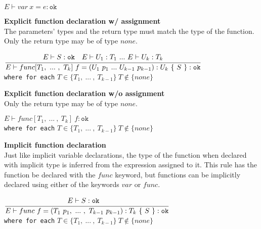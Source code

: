 \begin{center}
	\begin{math}
	E \vdash var\ x = e : \texttt{ok}
	\end{math}
\end{center}

\textbf{Explicit function declaration w/ assignment}\\
The parameters' types and the return type must match the type of the function.
Only the return type may be of type $none$.

\begin{center}
	\begin{math}
		\cfrac
		{E\vdash S : \texttt{ok}\quad E \vdash U_1 : T_1\
			.
			.
			.
			\ E \vdash U_k : T_k}
		{E \vdash func[T_1,\
			.
			.
			.
			\ ,\ T_k]\ f = (U_1\ p_1\
			.
			.
			.
			\ U_{k-1}\ p_{k-1}): U_k\ \{\ S\ \} : \texttt{ok}}
	\end{math}
	\\[1\baselineskip]
	\texttt{where for each} $T \in \{T_1,\ .
	.
	.
	\ ,\ T_{k-1}\}\ T \notin \{none\}$
\end{center}

\textbf{Explicit function declaration w/o assignment}\\
Only the return type may be of type $none$.

\begin{center}
	\begin{math}
	E \vdash func[T_1,\
		.
		.
		.
		\ ,\ T_k]\ f : \texttt{ok}
	\end{math}
	\\[1\baselineskip]
	\texttt{where for each} $T \in \{T_1,\ .
	.
	.
	\ ,\ T_{k-1}\}\ T \notin \{none\}$
\end{center}

\textbf{Implicit function declaration}\\
Just like implicit variable declarations, the type of the function when declared with implicit type is inferred from the expression assigned to it.
This rule has the function be declared with the $func$ keyword, but functions can be implicitly declared using either of the keywords $var$ or $func$.

\begin{center}
	\begin{math}
		\cfrac
		{E\vdash S : \texttt{ok}\quad}
		{E \vdash func\ f = (T_1\ p_1,\
		.
		.
		.
		\ ,\ T_{k-1}\ p_{k-1}): T_k\ \{\ S\ \} : \texttt{ok}}
	\end{math}
	\\[1\baselineskip]
	\texttt{where for each} $T \in \{T_1,\ .
	.
	.
	\ ,\ T_{k-1}\}\ T \notin \{none\}$
\end{center}

